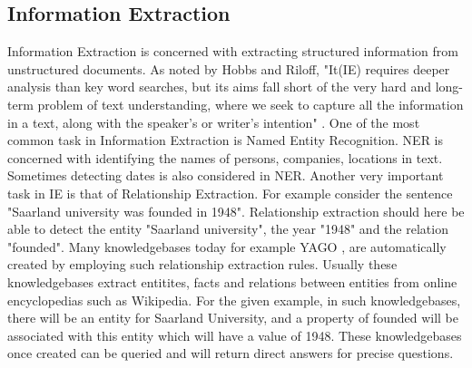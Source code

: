 \documentclass[
     11pt,         %
     a4paper,      %
     oneside,
     ]{article}
\begin{document}
\subsection{Information Extraction}
Information Extraction is concerned with extracting structured information from unstructured documents. As noted by Hobbs and Riloff, "It(IE) requires deeper analysis than  key word searches, but its aims fall short of the very hard and long-term problem of text understanding, where we seek to capture all the information in a text, along with the speaker's or writer's intention" \cite{hobbs-handbook10}.
One of the most common task in Information Extraction is Named Entity Recognition. NER is concerned with identifying the names of persons, companies, locations in text. Sometimes detecting dates is also considered in NER. Another very important task in IE is that of Relationship Extraction. For example consider the sentence "Saarland university was founded in 1948". Relationship extraction should here be able to detect the entity "Saarland university", the year "1948" and the relation "founded". Many knowledgebases today for example YAGO \cite{yago-website}, are automatically created by employing such relationship extraction rules. Usually these knowledgebases extract entitites, facts and relations between entities from online encyclopedias such as Wikipedia. For the given example, in such knowledgebases, there will be an entity for Saarland University, and a property of founded will be associated with this entity which will have a value of 1948. These knowledgebases once created can be queried and will return direct answers for precise questions.
\end{document}

